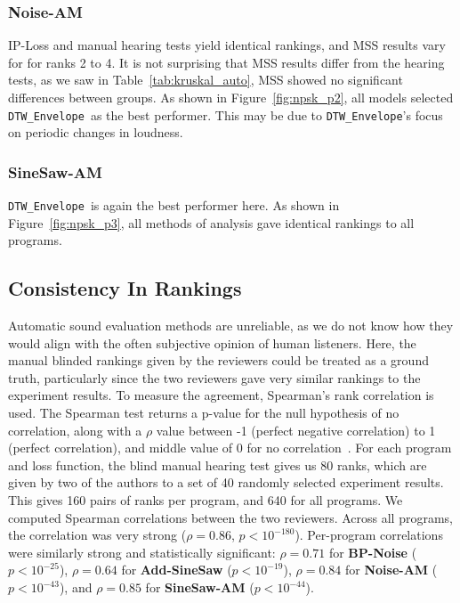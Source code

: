 \documentclass[lettersize,journal]{IEEEtran}
\newcommand{\DTWEnv}{\texttt{DTW\_Envelope}}
\newcommand{\BPNoise}{\textbf{BP-Noise}}
\newcommand{\AddSineSaw}{\textbf{Add-SineSaw}}
\newcommand{\AmpMod}{\textbf{Noise-AM}}
\newcommand{\FMMod}{\textbf{SineSaw-AM}}
\begin{document}
\subsubsection{\AmpMod}
IP-Loss and manual hearing tests yield identical rankings, and MSS results vary for for ranks 2 to 4.  It is not surprising that MSS results differ from the hearing tests, as we saw in Table~\ref{tab:kruskal_auto}, MSS showed no significant differences between groups. As shown in Figure~\ref{fig:npsk_p2}, all models selected \DTWEnv~as the best performer. This may be due to \DTWEnv's focus on periodic changes in loudness.

\subsubsection{\FMMod}
\DTWEnv~is again the best performer here. As shown in Figure~\ref{fig:npsk_p3}, all methods of analysis gave identical rankings to all programs.



\subsection{Consistency In Rankings}

Automatic sound evaluation methods are unreliable, as we do not know how they would align with the often subjective opinion of human listeners. Here, the manual blinded rankings given by the reviewers could be treated as a ground truth, particularly since the two reviewers gave very similar rankings to the experiment results. To measure the agreement, Spearman's rank correlation is used. The Spearman test returns a p-value for the null hypothesis of no correlation, along with a $\rho$ value between -1 (perfect negative correlation) to 1 (perfect correlation), and middle value of 0 for no correlation~\cite{spearman1987proof,rebekic2015pearson}. For each program and loss function, the blind manual hearing test gives us 80 ranks, which are given by two of the authors to a set of 40 randomly selected experiment results. This gives 160 pairs of ranks per program, and 640 for all programs. We computed Spearman correlations between the two reviewers. Across all programs, the correlation was very strong ($\rho = 0.86$, $p < 10^{-180}$). Per-program correlations were similarly strong and statistically significant: $\rho = 0.71$ for \BPNoise{} ($p < 10^{-25}$), $\rho = 0.64$ for \AddSineSaw{} ($p < 10^{-19}$), $\rho = 0.84$ for \AmpMod{} ($p < 10^{-43}$), and $\rho = 0.85$ for \FMMod{} ($p < 10^{-44}$). 
\end{document}
